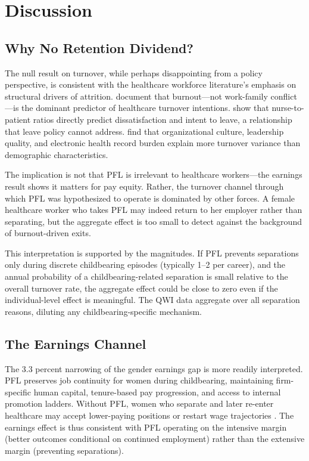 \documentclass[12pt]{article}
\begin{document}
\section{Discussion}\label{sec:discussion}

\subsection{Why No Retention Dividend?}

The null result on turnover, while perhaps disappointing from a policy perspective, is consistent with the healthcare workforce literature's emphasis on structural drivers of attrition. \citet{shanafelt2017} document that burnout---not work-family conflict---is the dominant predictor of healthcare turnover intentions. \citet{aiken2002} show that nurse-to-patient ratios directly predict dissatisfaction and intent to leave, a relationship that leave policy cannot address. \citet{dyrbye2019} find that organizational culture, leadership quality, and electronic health record burden explain more turnover variance than demographic characteristics.

The implication is not that PFL is irrelevant to healthcare workers---the earnings result shows it matters for pay equity. Rather, the turnover channel through which PFL was hypothesized to operate is dominated by other forces. A female healthcare worker who takes PFL may indeed return to her employer rather than separating, but the aggregate effect is too small to detect against the background of burnout-driven exits.

This interpretation is supported by the magnitudes. If PFL prevents separations only during discrete childbearing episodes (typically 1--2 per career), and the annual probability of a childbearing-related separation is small relative to the overall turnover rate, the aggregate effect could be close to zero even if the individual-level effect is meaningful. The QWI data aggregate over all separation reasons, diluting any childbearing-specific mechanism.

\subsection{The Earnings Channel}

The 3.3 percent narrowing of the gender earnings gap is more readily interpreted. PFL preserves job continuity for women during childbearing, maintaining firm-specific human capital, tenure-based pay progression, and access to internal promotion ladders. Without PFL, women who separate and later re-enter healthcare may accept lower-paying positions or restart wage trajectories \citep{goldin2014, kleven2019}. The earnings effect is thus consistent with PFL operating on the intensive margin (better outcomes conditional on continued employment) rather than the extensive margin (preventing separations).
\end{document}

